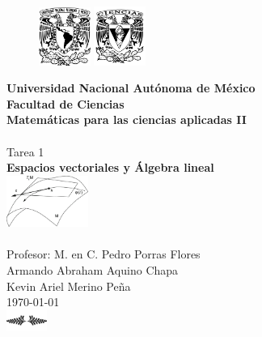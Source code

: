 \documentclass[letterpaper]{article}
\renewcommand{\*}{\cdot}
\theoremstyle{definition}
\begin{document}
		\begin{titlepage}
		\begin{center}
			\begin{figure}[h]
				\includegraphics*[width=0.15\textwidth]{unam}
				\centering
				\hspace{0.6cm}
				\includegraphics*[width=0.15\textwidth]{ciencias}
				\centering
			\end{figure}
			\Large{\textbf{Universidad Nacional Autónoma de México}} \\[0.5cm]
			\Large{\textbf{Facultad de Ciencias}} \\[0.5cm]
			\Large{\textbf{Matemáticas para las ciencias aplicadas II}} \\[0.5cm]
			\hrulefill \\[2cm]
			\Huge{Tarea 1}\\
			\Huge{\textbf{Espacios vectoriales y Álgebra lineal}}\\ [1cm]
			\includegraphics*[width=0.2\textwidth]{space}\\[1.5cm]
			\hrulefill \\[1.5cm]
			\large{Profesor: M. en C. Pedro Porras Flores}\\
			\large{Armando Abraham Aquino Chapa}\\
			\large{Kevin Ariel Merino Peña}
			\\[1cm]
			\today\\ [0.3cm]
			\includegraphics[width=0.1\textwidth]{ornamental}

		\end{center}
		
	\end{titlepage}
\end{document}
